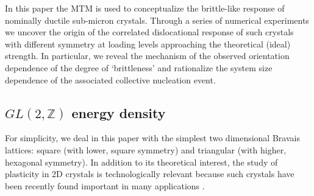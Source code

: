 \documentclass[CRPHYS,Unicode,manuscript]{cedram}
\begin{document}
In this paper  the MTM is  used to  conceptualize  the brittle-like response of nominally ductile sub-micron crystals.  Through a series of  numerical experiments we uncover  the origin of  the correlated dislocational response of  such crystals with different symmetry  at  loading  levels approaching  the theoretical (ideal) strength.   In particular, we reveal  the mechanism of  the   observed orientation dependence of the   degree of `brittleness' and rationalize the  system size dependence of the associated collective  nucleation event.

\subsection{$GL(2,\mathbb Z)$  energy density}

For simplicity,  we   deal  in this paper   with the simplest two dimensional Bravais lattices:  square (with lower, square symmetry) and triangular (with higher, hexagonal symmetry). In addition to its theoretical interest, the study of plasticity in 2D crystals is technologically relevant because such crystals  have been  recently found important in many applications \cite{Bhimanapati2015-bw,Chen2016-bd,Hoang2016-hm,Zhang2017-mb,Akinwande2017-mf,Chen2018-gt,Kryuchkov2018-ud,Van_Hoang2019-ob,Ma2020-mi}. 
\end{document}
